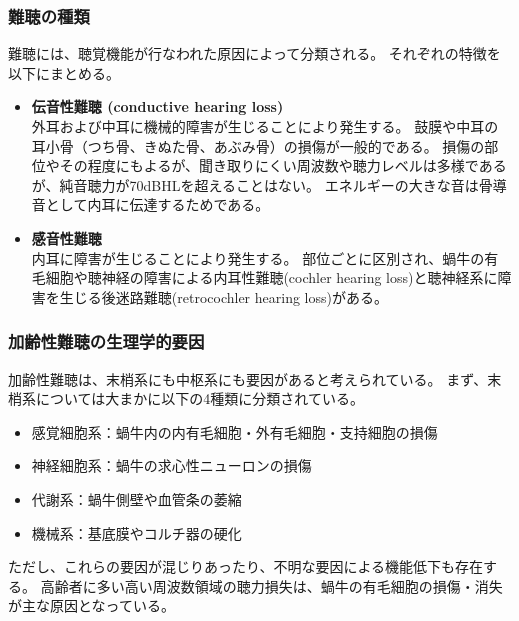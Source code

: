 \subsubsection{難聴の種類}
難聴には、聴覚機能が行なわれた原因によって分類される。
それぞれの特徴を以下にまとめる。

\begin{itemize}
\item \textbf{伝音性難聴 (conductive hearing loss)}\\
 外耳および中耳に機械的障害が生じることにより発生する。
 鼓膜や中耳の耳小骨（つち骨、きぬた骨、あぶみ骨）の損傷が一般的である。
 損傷の部位やその程度にもよるが、聞き取りにくい周波数や聴力レベルは多様であるが、純音聴力が70dBHLを超えることはない。
 エネルギーの大きな音は骨導音として内耳に伝達するためである。
\item \textbf{感音性難聴}\\
 内耳に障害が生じることにより発生する。
 部位ごとに区別され、蝸牛の有毛細胞や聴神経の障害による内耳性難聴(cochler hearing loss)と聴神経系に障害を生じる後迷路難聴(retrocochler hearing loss)がある。
\end{itemize}


\subsubsection{加齢性難聴の生理学的要因}
加齢性難聴は、末梢系にも中枢系にも要因があると考えられている。
まず、末梢系については大まかに以下の4種類に分類されている\cite{Schuknecht1993presbycusis}。
\begin{itemize}
\item 感覚細胞系：蝸牛内の内有毛細胞・外有毛細胞・支持細胞の損傷
\item 神経細胞系：蝸牛の求心性ニューロンの損傷
\item 代謝系：蝸牛側壁や血管条の萎縮
\item 機械系：基底膜やコルチ器の硬化
\end{itemize}
ただし、これらの要因が混じりあったり、不明な要因による機能低下も存在する。
高齢者に多い高い周波数領域の聴力損失は、蝸牛の有毛細胞の損傷・消失が主な原因となっている。



\clearpage
